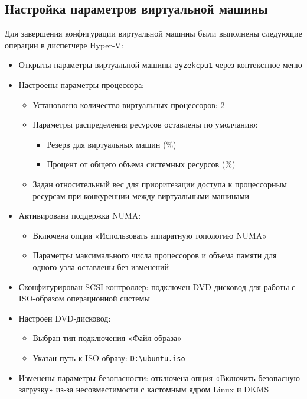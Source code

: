 \documentclass[areaset=advanced]{scrartcl}
\begin{document}
\subsection{Настройка параметров виртуальной машины}
Для завершения конфигурации виртуальной машины были выполнены следующие операции в диспетчере Hyper-V:
\begin{itemize}
    \item Открыты параметры виртуальной машины \texttt{ayzekcpu1} через контекстное меню
    \item Настроены параметры процессора:
    \begin{itemize}
        \item Установлено количество виртуальных процессоров: 2
        \item Параметры распределения ресурсов оставлены по умолчанию:
        \begin{itemize}
            \item Резерв для виртуальных машин (\%)
            \item Процент от общего объема системных ресурсов (\%)
        \end{itemize}
        \item Задан относительный вес для приоритезации доступа к процессорным ресурсам при конкуренции между виртуальными машинами
    \end{itemize}
    \item Активирована поддержка NUMA:
    \begin{itemize}
        \item Включена опция «Использовать аппаратную топологию NUMA»
        \item Параметры максимального числа процессоров и объема памяти для одного узла оставлены без изменений
    \end{itemize}
    \item Сконфигурирован SCSI-контроллер: подключен DVD-дисковод для работы с ISO-образом операционной системы
    \item Настроен DVD-дисковод:
    \begin{itemize}
        \item Выбран тип подключения «Файл образа»
        \item Указан путь к ISO-образу: \texttt{D:\textbackslash ubuntu.iso}
    \end{itemize}
    \item Изменены параметры безопасности: отключена опция «Включить безопасную загрузку» из-за несовместимости с кастомным ядром Linux и DKMS

\end{itemize}
\end{document}
